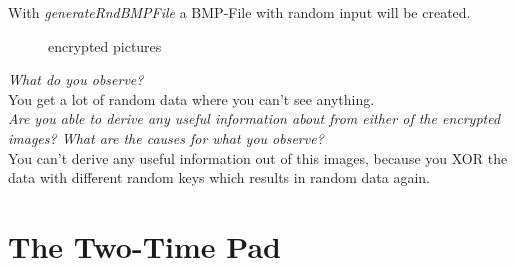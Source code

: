 With \textit{generateRndBMPFile} a BMP-File with random input will be created.\\

\begin{figure}[htp]
    \centering
    \caption{encrypted pictures}
\end{figure}

\textit{What do you observe?}\\
 You get a lot of random data where you can't see anything.\\
 
\textit{Are you able to derive any useful information about from either of the encrypted images? What are the causes for what you observe?}\\
You can't derive any useful information out of this images, because you XOR the data with different random keys which results in random data again.\\


\section{The Two-Time Pad}


